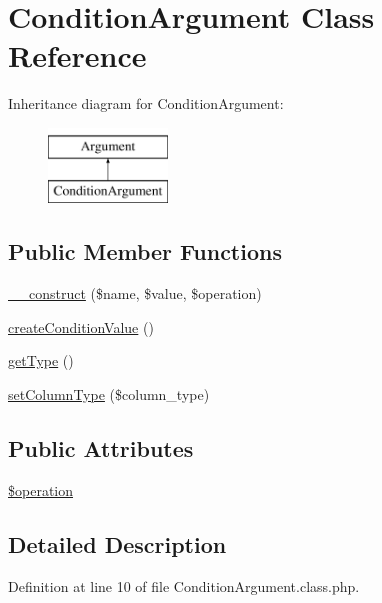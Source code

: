 \hypertarget{classConditionArgument}{\section{Condition\-Argument Class Reference}
\label{classConditionArgument}
}
Inheritance diagram for Condition\-Argument\-:\begin{figure}[H]
\begin{center}
\leavevmode
\includegraphics[height=2.000000cm]{classConditionArgument}
\end{center}
\end{figure}
\subsection*{Public Member Functions}
\begin{DoxyCompactItemize}
\item 
\hyperlink{classConditionArgument_a91e5771ef525141e6ef9b11def712e04}{\-\_\-\-\_\-construct} (\$name, \$value, \$operation)
\item 
\hyperlink{classConditionArgument_a2f1c182c8765ebc62d2d50f575954982}{create\-Condition\-Value} ()
\item 
\hyperlink{classConditionArgument_a39922137cc67e751a5577850bce3cac7}{get\-Type} ()
\item 
\hyperlink{classConditionArgument_a7ee8444a1bfa4763458a006e0fd6ef1e}{set\-Column\-Type} (\$column\-\_\-type)
\end{DoxyCompactItemize}
\subsection*{Public Attributes}
\begin{DoxyCompactItemize}
\item 
\hyperlink{classConditionArgument_acfccaada47560781bfbdf51086ce3869}{\$operation}
\end{DoxyCompactItemize}


\subsection{Detailed Description}


Definition at line 10 of file Condition\-Argument.\-class.\-php.



